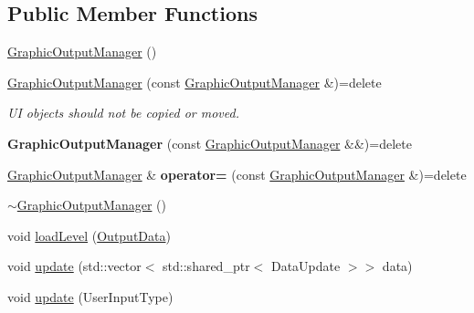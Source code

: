 \subsection*{Public Member Functions}
\begin{DoxyCompactItemize}
\item 
\mbox{\hyperlink{class_graphic_output_manager_adf8a096f7b671b182b74bb130ffd6b99}{Graphic\+Output\+Manager}} ()
\item 
\mbox{\label{class_graphic_output_manager_accbac7b69a0eacd891cd2196213ec21e}} 
\mbox{\hyperlink{class_graphic_output_manager_accbac7b69a0eacd891cd2196213ec21e}{Graphic\+Output\+Manager}} (const \mbox{\hyperlink{class_graphic_output_manager}{Graphic\+Output\+Manager}} \&)=delete
\begin{DoxyCompactList}\small\item\em UI objects should not be copied or moved. \end{DoxyCompactList}\item 
\mbox{\label{class_graphic_output_manager_a0be3ed3dd2fe8d7a742376754dd1e04f}} 
{\bfseries Graphic\+Output\+Manager} (const \mbox{\hyperlink{class_graphic_output_manager}{Graphic\+Output\+Manager}} \&\&)=delete
\item 
\mbox{\label{class_graphic_output_manager_af289b7768cac2928aaae9990b0a16360}} 
\mbox{\hyperlink{class_graphic_output_manager}{Graphic\+Output\+Manager}} \& {\bfseries operator=} (const \mbox{\hyperlink{class_graphic_output_manager}{Graphic\+Output\+Manager}} \&)=delete
\item 
\mbox{\hyperlink{class_graphic_output_manager_a13de402f591b8bfa7a11d4c2b84dfd83}{$\sim$\+Graphic\+Output\+Manager}} ()
\item 
void \mbox{\hyperlink{class_graphic_output_manager_af2d827a7b2ae16889e66e67c18c731d1}{load\+Level}} (\mbox{\hyperlink{class_output_data}{Output\+Data}})
\item 
void \mbox{\hyperlink{class_graphic_output_manager_aed60e3ba3328c6ca2ab0b3bf60e9871f}{update}} (std\+::vector$<$ std\+::shared\+\_\+ptr$<$ Data\+Update $>$$>$ data)
\item 
void \mbox{\hyperlink{class_graphic_output_manager_a64226361d4d827e5c16b76fcf86f4f6f}{update}} (User\+Input\+Type)
\item 
\mbox{\label{class_graphic_output_manager_a47d7b9f87ba91f23981a1c3230a51dff}} 
$$
\end{DoxyCompactItemize}
